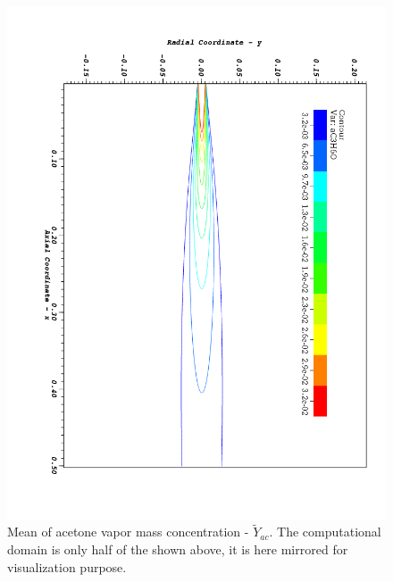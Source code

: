 \clearpage
\begin{figure}
\begin{center}
  \includegraphics[height=0.9\textheight]{./figuras/appA2/visit_aC3H6O.png}
 \end{center}
 \caption{Mean of acetone vapor mass concentration - $\tilde{Y}_{ac}$. The computational domain is only half of the shown above, it is here mirrored for visualization purpose.}
 \label{fig: aa}
\end{figure}

\FloatBarrier
